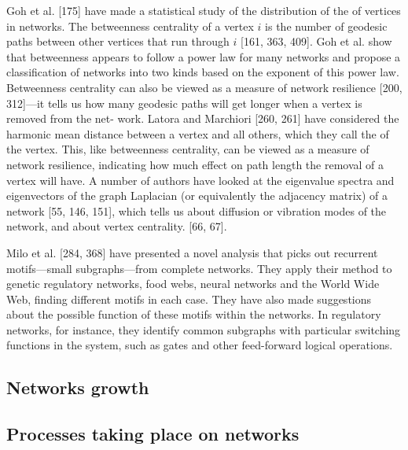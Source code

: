       Goh et al. [175] have made a statistical study of the distribution of the  of vertices in networks. The betweenness centrality of a vertex $i$ is the number of geodesic paths between other vertices that run through $i$ [161, 363, 409]. Goh et al. show that betweenness appears to follow a power law for many networks and propose a classification of networks into two kinds based on the exponent of this power law. Betweenness centrality can also be viewed as a measure of network resilience [200, 312]—it tells us how many geodesic paths will get longer when a vertex is removed from the net- work. Latora and Marchiori [260, 261] have considered the harmonic mean distance between a vertex and all others, which they call the  of the vertex. This, like betweenness centrality, can be viewed as a measure of network resilience, indicating how much effect on path length the removal of a vertex will have. A number of authors have looked at the eigenvalue spectra and eigenvectors of the graph Laplacian (or equivalently the adjacency matrix) of a network [55, 146, 151], which tells us about diffusion or vibration modes of the network, and about vertex centrality. [66, 67].
      
      Milo et al. [284, 368] have presented a novel analysis that picks out recurrent motifs—small subgraphs—from complete networks. They apply their method to genetic regulatory networks, food webs, neural networks and the World Wide Web, finding different motifs in each case. They have also made suggestions about the possible function of these motifs within the networks. In regulatory networks, for instance, they identify common subgraphs with particular switching functions in the system, such as gates and other feed-forward logical operations.

  \subsection{Networks growth}
    
  \subsection{Processes taking place on networks}